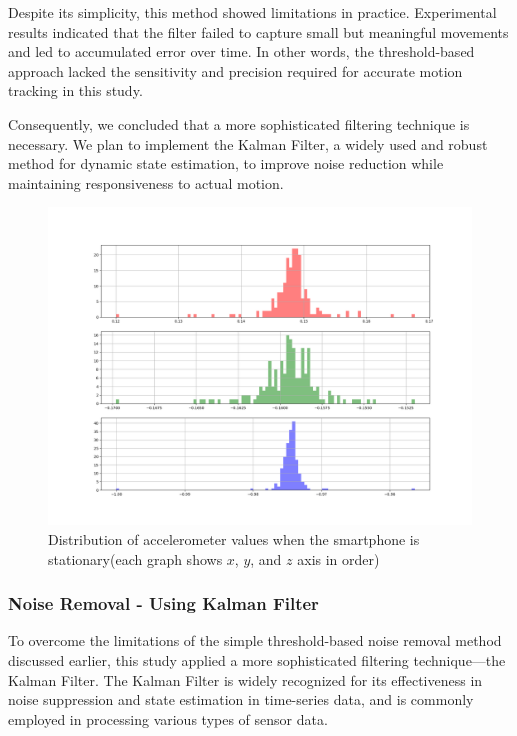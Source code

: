 \documentclass{article}
\begin{document}
Despite its simplicity, this method showed limitations in practice. Experimental results indicated that the filter failed to capture small but meaningful movements and led to accumulated error over time. In other words, the threshold-based approach lacked the sensitivity and precision required for accurate motion tracking in this study.

Consequently, we concluded that a more sophisticated filtering technique is necessary. We plan to implement the Kalman Filter, a widely used and robust method for dynamic state estimation, to improve noise reduction while maintaining responsiveness to actual motion.

\FloatBarrier
\begin{figure}[h]
    \centering
    \includegraphics[width=\textwidth]{2_1_7_1.png}
    \caption{Distribution of accelerometer values when the smartphone is stationary(each graph shows $x$, $y$, and $z$ axis in order)}
    \label{fig:accel_histogram}
\end{figure}

\FloatBarrier
\subsubsection{Noise Removal - Using Kalman Filter}
To overcome the limitations of the simple threshold-based noise removal method discussed earlier, this study applied a more sophisticated filtering technique—the Kalman Filter. The Kalman Filter is widely recognized for its effectiveness in noise suppression and state estimation in time-series data, and is commonly employed in processing various types of sensor data.
\end{document}
